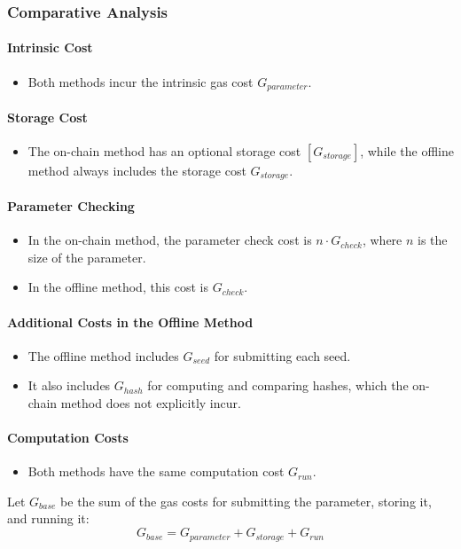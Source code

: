 \documentclass[runningheads]{llncs}
\begin{document}
\subsubsection{Comparative Analysis}

\paragraph*{Intrinsic Cost}
\begin{itemize}
    \item Both methods incur the intrinsic gas cost \( G_{parameter} \).
\end{itemize}

\paragraph*{Storage Cost}
\begin{itemize}
    \item The on-chain method has an optional storage cost \( [G_{storage}] \), while the offline method always includes the storage cost \( G_{storage} \). %
\end{itemize}

\paragraph*{Parameter Checking}
\begin{itemize}
    \item In the on-chain method, the parameter check cost is \( n \cdot G_{check} \), where \( n \) is the size of the parameter.
    \item In the offline method, this cost is \( G_{check} \).
\end{itemize}

\paragraph*{Additional Costs in the Offline Method}
\begin{itemize}
    \item The offline method includes \(  G_{seed} \) for submitting each seed.
    \item It also includes \(  G_{hash} \) for computing and comparing hashes, which the on-chain method does not explicitly incur.
\end{itemize}

\paragraph*{Computation Costs}
\begin{itemize}
    \item Both methods have the same computation cost \( G_{run} \).
\end{itemize}
Let \( G_{base} \) be the sum of the gas costs for submitting the parameter, storing it, and running it:
\[
G_{base} = G_{parameter} + G_{storage} + G_{run}
\]
\end{document}

